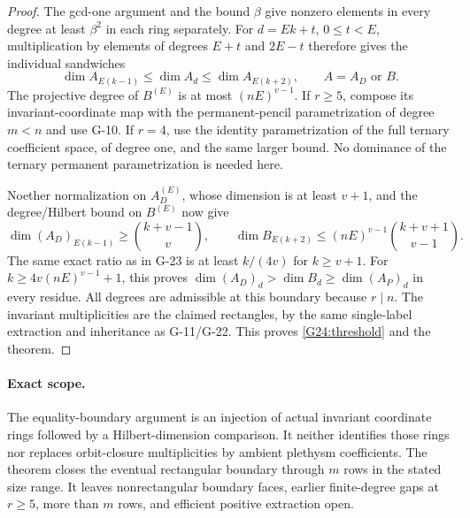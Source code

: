 \begin{proof}
The gcd-one argument and the bound $\beta$ give nonzero
elements in every degree at least $\beta^2$ in each ring
separately. For $d=Ek+t$, $0\le t<E$, multiplication by
elements of degrees $E+t$ and $2E-t$ therefore gives the
individual sandwiches
\[
 \dim A_{E(k-1)}\le\dim A_d\le\dim A_{E(k+2)},
 \qquad A=A_D\text{ or }B.
\]
The projective degree of $B^{(E)}$ is at most
$(nE)^{v-1}$. If $r\ge5$, compose its invariant-coordinate
map with the permanent-pencil parametrization of degree
$m<n$ and use G-10. If $r=4$, use the identity parametrization
of the full ternary coefficient space, of degree one, and
the same larger bound. No dominance of the ternary
permanent parametrization is needed here.

Noether normalization on $A_D^{(E)}$, whose dimension is
at least $v+1$, and the degree/Hilbert bound on $B^{(E)}$
now give
\[
 \dim(A_D)_{E(k-1)}\ge\binom{k+v-1}{v},\qquad
 \dim B_{E(k+2)}\le(nE)^{v-1}\binom{k+v+1}{v-1}.
\]
The same exact ratio as in G-23 is at least $k/(4v)$ for
$k\ge v+1$. For $k\ge4v(nE)^{v-1}+1$, this proves
$\dim(A_D)_d>\dim B_d\ge\dim(A_P)_d$ in every residue.
All degrees are admissible at this boundary because $r\mid n$.
The invariant multiplicities are the claimed rectangles,
by the same single-label extraction and inheritance as
G-11/G-22. This proves \eqref{G24:threshold} and the theorem.
\end{proof}

\paragraph{Exact scope.}
The equality-boundary argument is an injection of actual
invariant coordinate rings followed by a Hilbert-dimension
comparison. It neither identifies those rings nor replaces
orbit-closure multiplicities by ambient plethysm coefficients.
The theorem closes the eventual rectangular boundary through
$m$ rows in the stated size range. It leaves nonrectangular
boundary faces, earlier finite-degree gaps at $r\ge5$,
more than $m$ rows, and efficient positive extraction open.



